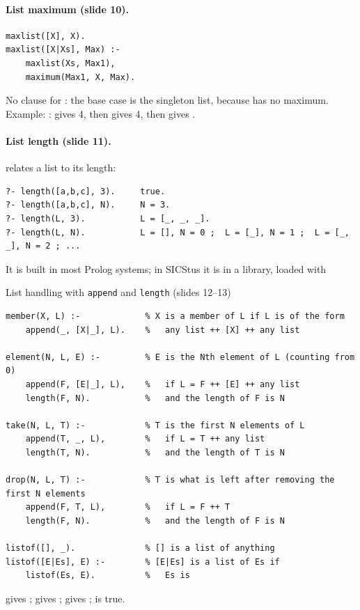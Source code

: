 \paragraph{List maximum (slide 10).}
\begin{verbatim}
maxlist([X], X).
maxlist([X|Xs], Max) :-
    maxlist(Xs, Max1),
    maximum(Max1, X, Max).
\end{verbatim}
No clause for \code{[]}: the base case is the singleton list, because \code{[]} has no
maximum. Example: :  gives 4, then
 gives 4, then  gives .

\paragraph{List length (slide 11).}  relates a list to its length:
\begin{verbatim}
?- length([a,b,c], 3).     true.
?- length([a,b,c], N).     N = 3.
?- length(L, 3).           L = [_, _, _].
?- length(L, N).           L = [], N = 0 ;  L = [_], N = 1 ;  L = [_, _], N = 2 ; ...
\end{verbatim}
It is built in most Prolog systems; in SICStus it is in a library, loaded with

\begin{nbfact}{List handling with \texttt{append} and \texttt{length} (slides 12--13)}
\begin{verbatim}
member(X, L) :-             % X is a member of L if L is of the form
    append(_, [X|_], L).    %   any list ++ [X] ++ any list

element(N, L, E) :-         % E is the Nth element of L (counting from 0)
    append(F, [E|_], L),    %   if L = F ++ [E] ++ any list
    length(F, N).           %   and the length of F is N

take(N, L, T) :-            % T is the first N elements of L
    append(T, _, L),        %   if L = T ++ any list
    length(T, N).           %   and the length of T is N

drop(N, L, T) :-            % T is what is left after removing the first N elements
    append(F, T, L),        %   if L = F ++ T
    length(F, N).           %   and the length of F is N

listof([], _).              % [] is a list of anything
listof([E|Es], E) :-        % [E|Es] is a list of Es if
    listof(Es, E).          %   Es is
\end{verbatim}
 gives ;  gives
;  gives ;
 is true.
\end{nbfact}


